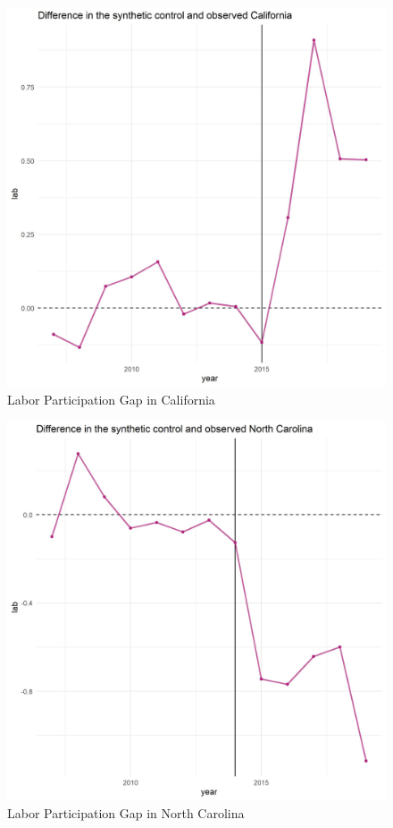 \documentclass{article}
\begin{document}
 \begin{figure}[H]
    \caption{Labor Participation Gap in California}
    \begin{center}
        \includegraphics[width=.85\textwidth]{ca_lab_diff}
    \end{center}
    \label{fig:ca_lab_diff}{}
\end{figure}

 \begin{figure}[H]
    \caption{Labor Participation Gap in North Carolina}
    \begin{center}
        \includegraphics[width=.85\textwidth]{nc_lab_diff}
    \end{center}
    \label{fig:nc_lab_diff}{}
\end{figure}
\end{document}
